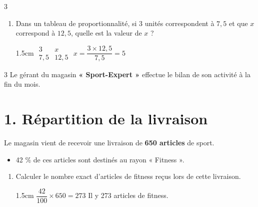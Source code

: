 \documentclass[a4paper]{book}
\begin{document}
{\begin{exerciceNote}{3}
\begin{enumerate}[leftmargin=*]
            \begin{ZoneReponse}{1.5cm}   
                $\begin{array}{c|c}
                    3 & 7 \\ \hline
                    1,2 & 
                \end{array}$ \quad 
                $\dfrac{7\times1,2}{3}\simeq 2,8$
            \end{ZoneReponse}

            \item Dans un tableau de proportionnalité, si $3$ unités correspondent à $7,5$ et que $x$ correspond à $12,5$, quelle est la valeur de $x$ ?

            \begin{ZoneReponse}{1.5cm}    
                $\begin{array}{c|c}
                     3 &  x \\ \hline
                     7,5 & 12,5
                \end{array}$ \quad 
                $x=\dfrac{3\times12,5}{7,5}=5$
            \end{ZoneReponse}
        \end{enumerate}
    \end{exerciceNote}


    \begin{exerciceNote}{3}
        \noindent Le gérant du magasin \textbf{« Sport-Expert »} effectue le bilan de son activité à la fin du mois.
    
        \section*{1. Répartition de la livraison}
        Le magasin vient de recevoir une livraison de \textbf{650 articles} de sport.
        \begin{itemize}[label=\textbullet, leftmargin=*]
            \item 42 \% de ces articles sont destinés au rayon « Fitness ».
        \end{itemize}
        
        \begin{enumerate}[leftmargin=*]
            \item Calculer le nombre exact d'articles de fitness reçus lors de cette livraison.

            \begin{ZoneReponse}{1.5cm}   
                $\dfrac{42}{100}\times650=273$
                \quad Il y 273 articles de fitness.
            \end{ZoneReponse}
        \end{enumerate}
        

\end{exerciceNote}}
\end{document}
